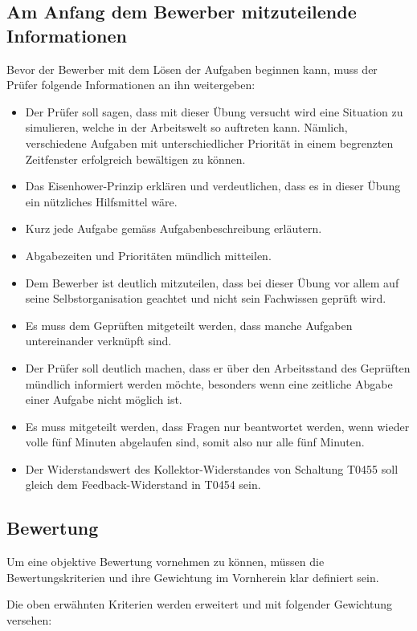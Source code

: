\subsection{Am Anfang dem Bewerber mitzuteilende Informationen}

Bevor der Bewerber mit dem Lösen der Aufgaben beginnen kann, muss der Prüfer folgende Informationen an ihn weitergeben:

\begin{itemize}
\item Der Prüfer soll sagen, dass mit dieser Übung versucht wird eine Situation zu simulieren, welche in der Arbeitswelt so auftreten kann. Nämlich, verschiedene Aufgaben mit unterschiedlicher Priorität in einem begrenzten Zeitfenster erfolgreich bewältigen zu können.
\item Das Eisenhower-Prinzip erklären und verdeutlichen, dass es in dieser Übung ein nützliches Hilfsmittel wäre.
\item Kurz jede Aufgabe gemäss Aufgabenbeschreibung erläutern.
\item Abgabezeiten und Prioritäten mündlich mitteilen.
\item Dem Bewerber ist deutlich mitzuteilen, dass bei dieser Übung vor allem auf seine Selbstorganisation geachtet und nicht sein Fachwissen geprüft wird.  
\item Es muss dem Geprüften mitgeteilt werden, dass manche Aufgaben untereinander verknüpft sind.
\item Der Prüfer soll deutlich machen, dass er über den Arbeitsstand des Geprüften mündlich informiert werden möchte, besonders wenn eine zeitliche Abgabe einer Aufgabe nicht möglich ist.
\item Es muss mitgeteilt werden, dass Fragen nur beantwortet werden, wenn wieder volle fünf Minuten abgelaufen sind, somit also nur alle fünf Minuten.
\item Der Widerstandswert des Kollektor-Widerstandes von Schaltung T0455 soll gleich dem Feedback-Widerstand in T0454 sein.
\end{itemize}

\subsection{Bewertung}

Um eine objektive Bewertung vornehmen zu können, müssen die Bewertungskriterien und ihre Gewichtung im Vornherein klar definiert sein.

Die oben erwähnten Kriterien werden erweitert und mit folgender Gewichtung versehen:


